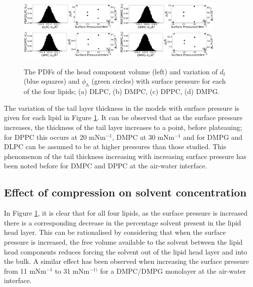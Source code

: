 \documentclass[twoside,twocolumn,9pt]{article}
\begin{document}
%
\begin{figure}
	\centering
	\includegraphics[width=0.45\textwidth]{figures/dlpc_vh_dt_phi}
	\includegraphics[width=0.45\textwidth]{figures/dmpc_vh_dt_phi}
	\includegraphics[width=0.45\textwidth]{figures/dppc_vh_dt_phi}
	\includegraphics[width=0.45\textwidth]{figures/dmpg_vh_dt_phi}
	\caption{The PDFs of the head component volume (left) and variation of $d_t$ (blue squares) and $\phi_h$ (green circles) with surface pressure for each of the four lipids; (a) DLPC, (b) DMPC, (c) DPPC, (d) DMPG.}
	\label{fig:lipresults}
\end{figure}
%
The variation of the tail layer thickness in the models with surface pressure is given for each lipid in Figure \ref{fig:lipresults}. It can be observed that as the surface pressure increases, the thickness of the tail layer increases to a point, before plateauing; for DPPC this occurs at 20 mNm$^{-1}$, DMPC at 30 mNm$^{-1}$ and for DMPG and DLPC can be assumed to be at higher pressures than those studied. This phenomenon of the tail thickness increasing with increasing surface pressure has been noted before for DMPC\cite{Bayerl1990} and DPPC\cite{Campbell2018} at the air-water interface.

\subsection{Effect of compression on solvent concentration}
In Figure \ref{fig:lipresults}, it is clear that for all four lipids, as the surface pressure is increased there is a corresponding decrease in the percentage solvent present in the lipid head layer. This can be rationalised by considering that when the surface pressure is increased, the free volume available to the solvent between the lipid head components reduces forcing the solvent out of the lipid head layer and into the bulk. A similar effect has been observed when increasing the surface pressure from 11 mNm$^{-1}$ to 31 mNm$^{-1)}$ for a DMPC/DMPG monolayer at the air-water interface.\cite{Bayerl1990}
\end{document}
